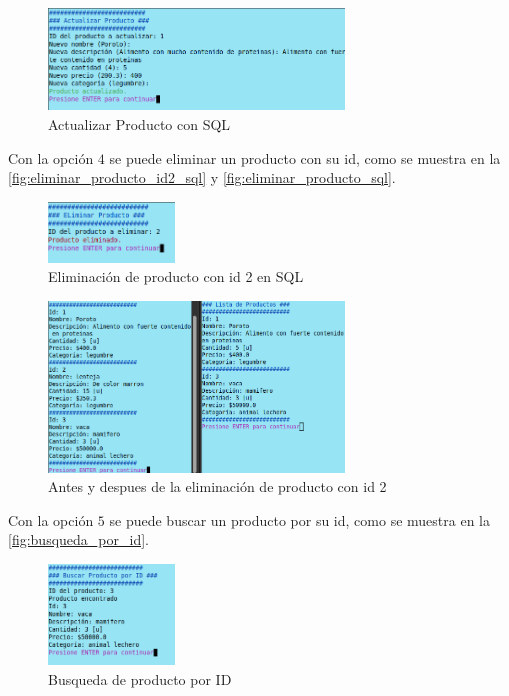 \documentclass[12pt]{article}
\begin{document}
\begin{figure}[H]
	\centering
	\setlength{\fboxrule}{0pt}
	\includegraphics[width=0.7\textwidth]{Imagenes/actualizar_producto_sql.png}
	\caption{Actualizar Producto con SQL}
	\label{fig:actualizar_producto_sql}
\end{figure} 

Con la opción $4$ se puede eliminar un producto con su id, como se muestra en la \autoref{fig:eliminar_producto_id2_sql} y \autoref{fig:eliminar_producto_sql}.

\begin{figure}[H]
	\centering
	\setlength{\fboxrule}{0pt}
	\includegraphics[width=0.3\textwidth]{Imagenes/eliminar_id2.png}
	\caption{Eliminación de producto con id 2 en SQL}
	\label{fig:eliminar_producto_id2_sql}
\end{figure} 

\begin{figure}[H]
	\centering
	\setlength{\fboxrule}{0pt}
	\includegraphics[width=0.7\textwidth]{Imagenes/eliminar_producto_sql.png}
	\caption{Antes y despues de la eliminación de producto con id 2}
	\label{fig:eliminar_producto_sql}
\end{figure} 

Con la opción $5$ se puede buscar un producto por su id, como se muestra en la \autoref{fig:busqueda_por_id}.

\begin{figure}[H]
	\centering
	\setlength{\fboxrule}{0pt}
	\includegraphics[width=0.3\textwidth]{Imagenes/busqueda_por_id.png}
	\caption{Busqueda de producto por ID}
	\label{fig:busqueda_por_id}
\end{figure} 
\end{document}
